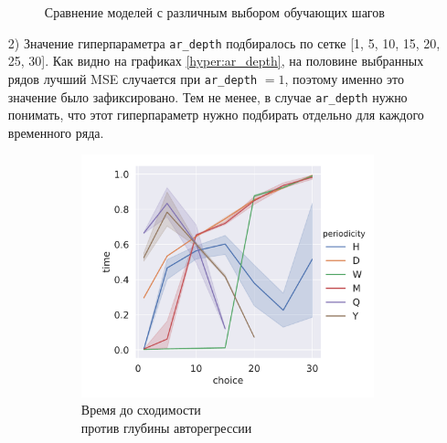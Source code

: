 \documentclass[a4paper,14pt]{extarticle}
\begin{document}
\begin{enumerate}
\begin{figure}[!h]
\begin{subfigure}[b]{.5\linewidth}
				\label{hyper:learning_steps:mse}
			\end{subfigure}
			\caption{Сравнение моделей с различным выбором обучающих шагов}
			\label{hyper:learning_steps}
		\end{figure}
		\newpage
  		\item[2)] Значение гиперпараметра \texttt{ar\_depth} подбиралось по сетке [1, 5, 10, 15, 20, 25, 30]. Как видно на графиках \ref{hyper:ar_depth}, на половине выбранных рядов лучший MSE случается при \texttt{ar\_depth} $ = 1$, поэтому именно это значение было зафиксировано. Тем не менее, в случае \texttt{ar\_depth} нужно понимать, что этот гиперпараметр нужно подбирать отдельно для каждого временного ряда.
		\begin{figure}[!h]
			\captionsetup{justification=centering}
			\begin{subfigure}[b]{.5\linewidth}
				\centering
				\includegraphics[width=\linewidth]{pictures/hyper-ar_depth-time.pdf}
				\caption{Время до сходимости \\ против глубины авторегрессии}
				\label{hyper:ar_depth:time}
			\end{subfigure}%
			\begin{subfigure}[b]{.5\linewidth}
				\centering

\end{subfigure}
\end{figure}
\end{enumerate}
\end{document}
